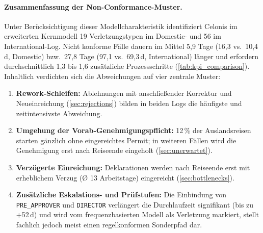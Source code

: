 \paragraph{Zusammenfassung der Non-Conformance-Muster.}
Unter Berücksichtigung dieser Modellcharakteristik identifiziert Celonis im erweiterten Kernmodell 19 Verletzungstypen im Domestic- und 56 im International-Log. Nicht konforme Fälle dauern im Mittel 5,9 Tage (16,3 vs.\ 10,4\,d, Domestic) bzw.\ 27,8 Tage (97,1 vs.\ 69,3\,d, International) länger und erfordern durchschnittlich 1,3 bis 1,6 zusätzliche Prozessschritte (\autoref{tab:kpi_comparison}). Inhaltlich verdichten sich die Abweichungen auf vier zentrale Muster:

\begin{enumerate}[noitemsep]
    \item \textbf{Rework-Schleifen:} Ablehnungen mit anschließender Korrektur und Neueinreichung (\autoref{sec:rejections}) bilden in beiden Logs die häufigste und zeitintensivste Abweichung.
    \item \textbf{Umgehung der Vorab-Genehmigungspflicht:} 12\,\% der Auslandsreisen starten gänzlich ohne eingereichtes Permit; in weiteren Fällen wird die Genehmigung erst nach Reiseende eingeholt (\autoref{sec:unerwartet}).
    \item \textbf{Verzögerte Einreichung:} Deklarationen werden nach Reiseende erst mit erheblichem Verzug (Ø 13 Arbeitstage) eingereicht (\autoref{sec:bottlenecks}).
    \item \textbf{Zusätzliche Eskalations- und Prüfstufen:} Die Einbindung von \texttt{PRE\_APPROVER} und \texttt{DIRECTOR} verlängert die Durchlaufzeit signifikant (bis zu +52\,d) und wird vom frequenzbasierten Modell als Verletzung markiert, stellt fachlich jedoch meist einen regelkonformen Sonderpfad dar.
\end{enumerate}
